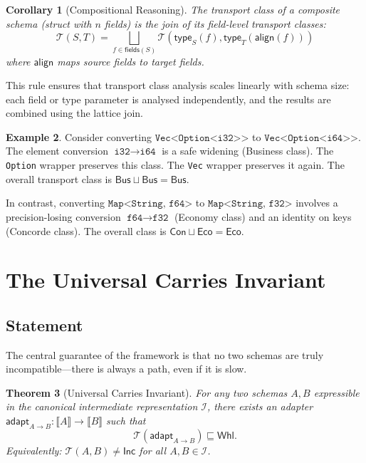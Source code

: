 \documentclass[11pt,a4paper]{article}
\newtheorem{theorem}{Theorem}[section]
\newtheorem{corollary}[theorem]{Corollary}
\theoremstyle{definition}
\newtheorem{example}[theorem]{Example}
\theoremstyle{remark}
\newcommand{\TC}{\mathcal{T}}                    %
\newcommand{\IR}{\mathcal{I}}                    %
\newcommand{\conc}{\textsf{Con}}                 %
\newcommand{\busi}{\textsf{Bus}}                 %
\newcommand{\econ}{\textsf{Eco}}                 %
\newcommand{\wheel}{\textsf{Whl}}               %
\newcommand{\incompat}{\textsf{Inc}}             %
\newcommand{\sem}[1]{\llbracket #1 \rrbracket}  %
\newcommand{\adapt}{\mathsf{adapt}}              %
\begin{document}
\begin{corollary}[Compositional Reasoning]\label{cor:compositional}
The transport class of a composite schema (struct with $n$ fields) is
the join of its field-level transport classes:
\[
  \TC(S, T) = \bigsqcup_{f \in \mathsf{fields}(S)}
    \TC(\mathsf{type}_S(f), \mathsf{type}_T(\mathsf{align}(f)))
\]
where $\mathsf{align}$ maps source fields to target fields.
\end{corollary}

This rule ensures that transport class analysis scales linearly with
schema size: each field or type parameter is analysed independently,
and the results are combined using the lattice join.

\begin{example}\label{ex:nested}
Consider converting
$\texttt{Vec<Option<i32>{>}}$ to
$\texttt{Vec<Option<i64>{>}}$. The element conversion
$\texttt{i32} \to \texttt{i64}$ is a safe widening (Business class).
The \texttt{Option} wrapper preserves this class. The \texttt{Vec}
wrapper preserves it again. The overall transport class is
$\busi \sqcup \busi = \busi$.

In contrast, converting $\texttt{Map<String, f64>}$ to
$\texttt{Map<String, f32>}$ involves a precision-losing conversion
$\texttt{f64} \to \texttt{f32}$ (Economy class) and an identity on
keys (Concorde class). The overall class is
$\conc \sqcup \econ = \econ$.
\end{example}

\section{The Universal Carries Invariant}\label{sec:carries}

\subsection{Statement}

The central guarantee of the framework is that no two schemas are
truly incompatible---there is always a path, even if it is slow.

\begin{theorem}[Universal Carries Invariant]\label{thm:carries}
For any two schemas $A, B$ expressible in the canonical intermediate
representation $\IR$, there exists an adapter
$\adapt_{A \to B} : \sem{A} \to \sem{B}$ such that
\[
  \TC(\adapt_{A \to B}) \sqsubseteq \wheel.
\]
Equivalently: $\TC(A, B) \neq \incompat$ for all $A, B \in \IR$.
\end{theorem}
\end{document}

